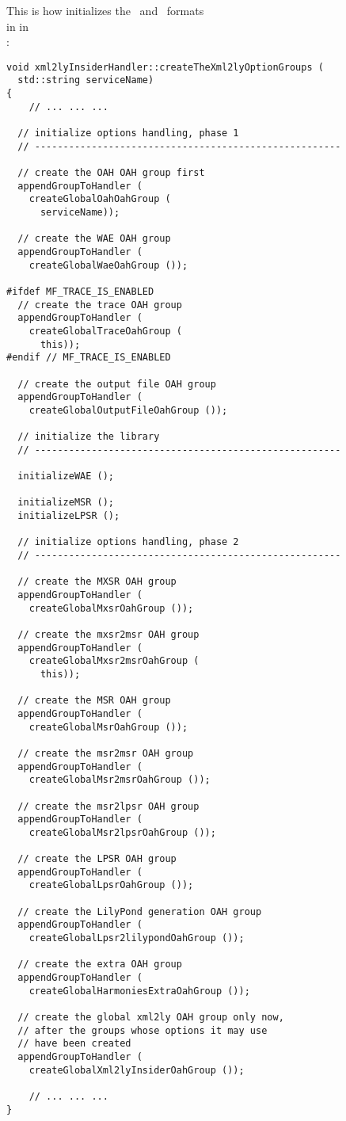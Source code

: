 This is how  initializes the \msrRepr\ and \lpsrRepr\ formats \\
in  in \\
:
\begin{lstlisting}[language=CPlusPlus]
void xml2lyInsiderHandler::createTheXml2lyOptionGroups (
  std::string serviceName)
{
	// ... ... ...

  // initialize options handling, phase 1
  // ------------------------------------------------------

  // create the OAH OAH group first
  appendGroupToHandler (
    createGlobalOahOahGroup (
      serviceName));

  // create the WAE OAH group
  appendGroupToHandler (
    createGlobalWaeOahGroup ());

#ifdef MF_TRACE_IS_ENABLED
  // create the trace OAH group
  appendGroupToHandler (
    createGlobalTraceOahGroup (
      this));
#endif // MF_TRACE_IS_ENABLED

  // create the output file OAH group
  appendGroupToHandler (
    createGlobalOutputFileOahGroup ());

  // initialize the library
  // ------------------------------------------------------

  initializeWAE ();

  initializeMSR ();
  initializeLPSR ();

  // initialize options handling, phase 2
  // ------------------------------------------------------

  // create the MXSR OAH group
  appendGroupToHandler (
    createGlobalMxsrOahGroup ());

  // create the mxsr2msr OAH group
  appendGroupToHandler (
    createGlobalMxsr2msrOahGroup (
      this));

  // create the MSR OAH group
  appendGroupToHandler (
    createGlobalMsrOahGroup ());

  // create the msr2msr OAH group
  appendGroupToHandler (
    createGlobalMsr2msrOahGroup ());

  // create the msr2lpsr OAH group
  appendGroupToHandler (
    createGlobalMsr2lpsrOahGroup ());

  // create the LPSR OAH group
  appendGroupToHandler (
    createGlobalLpsrOahGroup ());

  // create the LilyPond generation OAH group
  appendGroupToHandler (
    createGlobalLpsr2lilypondOahGroup ());

  // create the extra OAH group
  appendGroupToHandler (
    createGlobalHarmoniesExtraOahGroup ());

  // create the global xml2ly OAH group only now,
  // after the groups whose options it may use
  // have been created
  appendGroupToHandler (
    createGlobalXml2lyInsiderOahGroup ());

	// ... ... ...
}
\end{lstlisting}

